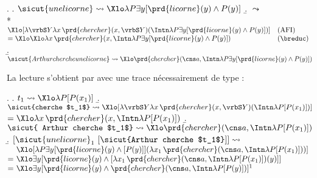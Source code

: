 \ex.
\a. \(\sicut{une licorne} \leadsto \Xlo\lambda P\exists y[\prd{licorne}(y)\wedge P(y)]\)
\b.  $\leadsto$
\\*
\(\begin{array}[t]{@{}llr}
\Xlo [\lambda\vrbS Y\lambda x\,\prd{chercher}(x,\vrbS Y)(\Intn\lambda P\exists y[\prd{licorne}(y)\wedge P(y)])]
& \text{(AFI)}\\
= \Xlo\Xlo\lambda x\,\prd{chercher}(x,\Intn\lambda P\exists y[\prd{licorne}(y)\wedge P(y)])&
\text{(\breduc)}
\end{array}
\)
\b.
\(\sicut{Arthur cherche une licorne} \leadsto \Xlo\prd{chercher}(\cns a,\Intn\lambda P\exists y[\prd{licorne}(y)\wedge P(y)])\)\label{x:Licorne1dd}


La lecture  s'obtient par  avec une trace nécessairement de type {\ett} :

\ex.
\a.
\(t_1 \leadsto \Xlo\lambda P [P(x_1)]\)
\b. \(\sicut{cherche $t_1$} \leadsto {\Xlo[\lambda\vrbS Y\lambda x\,\prd{chercher}(x,\vrbS Y)(\Intn\lambda P [P(x_1)])] }\)\\
\(= {\Xlo\lambda x\,\prd{chercher}(x,\Intn\lambda P [P(x_1)])}\)
\b. \(\sicut{ Arthur cherche $t_1$} \leadsto  {\Xlo\prd{chercher}(\cns a,\Intn\lambda P [P(x_1)])}\)
\b. 
  \([\sicut{une licorne}_1\ [\sicut{Arthur cherche $t_1$}]]   \leadsto {} \)\\
  \(\begin{array}[t]{@{}l@{\ }l}
  &\Xlo[\lambda P\exists y[\prd{licorne}(y)\wedge [P(y)]](\lambda x_1\,\prd{chercher}(\cns a,\Intn\lambda P[P(x_1)]))]\\
  =& \Xlo\exists y[\prd{licorne}(y)\wedge [\lambda x_1\,\prd{chercher}(\cns a,\Intn\lambda P[P(x_1)])(y)]] \\
   =& \Xlo\exists y[\prd{licorne}(y)\wedge \prd{chercher}(\cns a,\Intn\lambda P[P(y)])]\footnotemark
\end{array}
\)


\sloppy\largerpage[-1]

